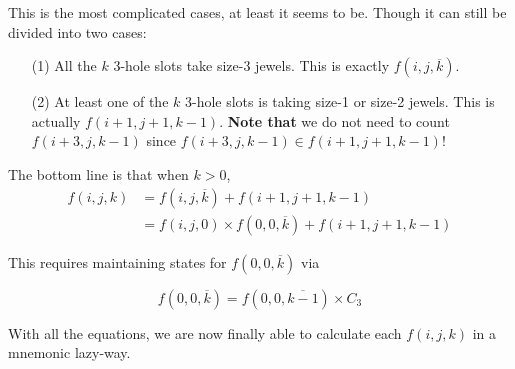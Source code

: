 \documentclass[a4paper,12pt]{article}
\begin{document}
\begin{enumerate}
\begin{itemize}
    This is the most complicated cases, at least it seems to
    be. Though it can still be divided into two cases:
    \begin{itemize}
    \item[(1)] All the $k$ 3-hole slots take size-3 jewels. This is
      exactly $f(i, j, \overline{k})$.
    \item[(2)] At least one of the $k$ 3-hole slots is taking size-1
      or size-2 jewels. This is actually $f(i + 1, j + 1, k -
      1)$. \textbf{Note that} we do not need to count $f(i + 3, j, k
      -1)$ since $f(i + 3, j, k - 1) \in f(i + 1, j + 1, k -1)$!
    \end{itemize}

    The bottom line is that when $k > 0$,
    \begin{align}
      f(i, j, k) &= f(i, j, \overline{k}) + f(i + 1, j + 1, k - 1) \\
      &= f(i, j, 0) \times f(0, 0, \overline{k}) + f(i + 1, j + 1, k - 1)
    \end{align}

    This requires maintaining states for $f(0, 0, \overline{k})$ via

    \begin{equation}
      \label{eq:f00k}
      f(0, 0, \overline{k}) = f(0, 0, \overline{k-1}) \times C_3
    \end{equation}
  \end{itemize}

  With all the equations, we are now finally able to calculate each
  $f(i, j, k)$ in a mnemonic lazy-way.
\end{enumerate}
\end{document}
